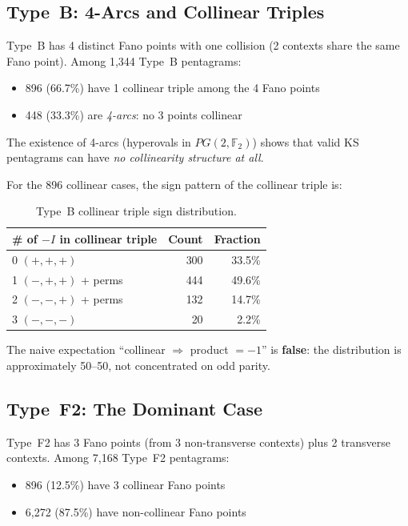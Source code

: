 \documentclass[11pt,a4paper]{article}
\theoremstyle{remark}
\newcommand{\F}{\mathbb{F}}
\begin{document}
\subsection{Type~B: 4-Arcs and Collinear Triples}

Type~B has 4 distinct Fano points with one collision (2 contexts share
the same Fano point). Among 1{,}344 Type~B pentagrams:

\begin{itemize}
  \item 896 (66.7\%) have 1 collinear triple among the 4 Fano points
  \item 448 (33.3\%) are \emph{4-arcs}: no 3 points collinear
\end{itemize}

The existence of 4-arcs (hyperovals in $PG(2, \F_2)$) shows that valid
KS pentagrams can have \emph{no collinearity structure at all}.

For the 896 collinear cases, the sign pattern of the collinear
triple is:

\begin{table}[h]
\centering
\begin{tabular}{l r r}
\toprule
\# of $-I$ in collinear triple & Count & Fraction \\
\midrule
0 $(+,+,+)$ & 300 & 33.5\% \\
1 $(-,+,+)$ + perms & 444 & 49.6\% \\
2 $(-,-,+)$ + perms & 132 & 14.7\% \\
3 $(-,-,-)$ & 20 & 2.2\% \\
\bottomrule
\end{tabular}
\caption{Type~B collinear triple sign distribution.}
\label{tab:type-b-signs}
\end{table}

The naive expectation ``collinear $\Rightarrow$ product $= -1$'' is
\textbf{false}: the distribution is approximately 50--50, not
concentrated on odd parity.

\subsection{Type~F2: The Dominant Case}

Type~F2 has 3 Fano points (from 3 non-transverse contexts) plus
2 transverse contexts. Among 7{,}168 Type~F2 pentagrams:

\begin{itemize}
  \item 896 (12.5\%) have 3 collinear Fano points
  \item 6{,}272 (87.5\%) have non-collinear Fano points
\end{itemize}
\end{document}
